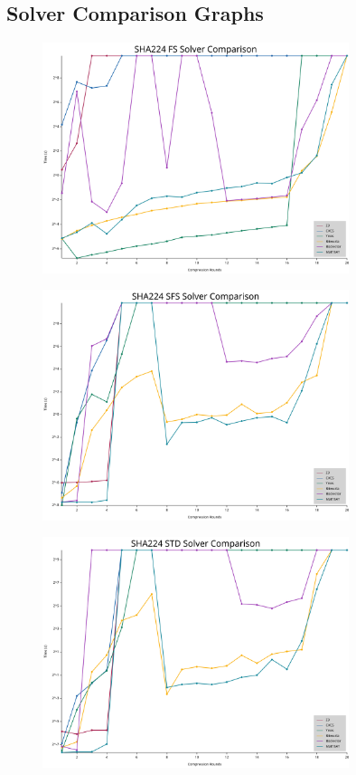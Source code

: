 \subsection{Solver Comparison Graphs}
\begin{figure}[H]
	\centering
	\includegraphics[width=0.8\textwidth]{../../graphs/solver_comparison_SHA224_FS.svg}
\end{figure}

\begin{figure}[H]
	\centering
	\includegraphics[width=0.8\textwidth]{../../graphs/solver_comparison_SHA224_SFS.svg}
\end{figure}

\begin{figure}[H]
	\centering
	\includegraphics[width=0.8\textwidth]{../../graphs/solver_comparison_SHA224_STD.svg}
\end{figure}

